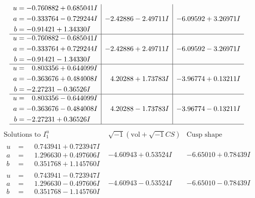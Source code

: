 \documentclass[1p]{elsarticle_modified}
\theoremstyle{definition}
\newcommand{\I}{\sqrt{-1}}
\begin{document}
$$\begin{array}{c|c|c}
\begin{aligned}
u &= -0.760882 + 0.685041 I \\
a &= -0.333764 - 0.729244 I \\
b &= -0.91421 + 1.34330 I\end{aligned}
 & -2.42886 - 2.49711 I & -6.09592 + 3.26971 I \\ \hline\begin{aligned}
u &= -0.760882 - 0.685041 I \\
a &= -0.333764 + 0.729244 I \\
b &= -0.91421 - 1.34330 I\end{aligned}
 & -2.42886 + 2.49711 I & -6.09592 - 3.26971 I \\ \hline\begin{aligned}
u &= \phantom{-}0.803356 + 0.644099 I \\
a &= -0.363676 + 0.484008 I \\
b &= -2.27231 - 0.36526 I\end{aligned}
 & \phantom{-}4.20288 + 1.73783 I & -3.96774 + 0.13211 I \\ \hline\begin{aligned}
u &= \phantom{-}0.803356 - 0.644099 I \\
a &= -0.363676 - 0.484008 I \\
b &= -2.27231 + 0.36526 I\end{aligned}
 & \phantom{-}4.20288 - 1.73783 I & -3.96774 - 0.13211 I\\
 \hline 
 \end{array}$$\newpage$$\begin{array}{c|c|c}  
\text{Solutions to }I^u_{1}& \I (\text{vol} + \sqrt{-1}CS) & \text{Cusp shape}\\
 \hline 
\begin{aligned}
u &= \phantom{-}0.743941 + 0.723947 I \\
a &= \phantom{-}1.296630 + 0.497606 I \\
b &= \phantom{-}0.351768 + 1.145760 I\end{aligned}
 & -4.60943 + 0.53524 I & -6.65010 + 0.78439 I \\ \hline\begin{aligned}
u &= \phantom{-}0.743941 - 0.723947 I \\
a &= \phantom{-}1.296630 - 0.497606 I \\
b &= \phantom{-}0.351768 - 1.145760 I\end{aligned}
 & -4.60943 - 0.53524 I & -6.65010 - 0.78439 I \\ \hline\begin{aligned}

\end{aligned}
\end{array}$$
\end{document}
